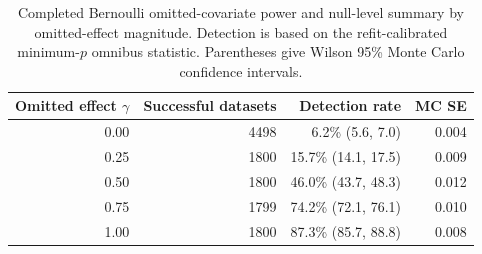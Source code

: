 \begin{table}[htbp]
\small
\caption{Completed Bernoulli omitted-covariate power and null-level summary by omitted-effect magnitude. Detection is based on the refit-calibrated minimum-$p$ omnibus statistic. Parentheses give Wilson 95\% Monte Carlo confidence intervals.}
\label{tab:bernoulli-power-full-gamma}
\begin{tabular*}{\textwidth}{@{}r@{\extracolsep{\fill}}rrr@{}}
\toprule
Omitted effect $\gamma$ & Successful datasets & Detection rate & MC SE \\
\midrule
0.00 & 4498 & 6.2\% (5.6, 7.0) & 0.004 \\
0.25 & 1800 & 15.7\% (14.1, 17.5) & 0.009 \\
0.50 & 1800 & 46.0\% (43.7, 48.3) & 0.012 \\
0.75 & 1799 & 74.2\% (72.1, 76.1) & 0.010 \\
1.00 & 1800 & 87.3\% (85.7, 88.8) & 0.008 \\
\bottomrule
\end{tabular*}
\end{table}

